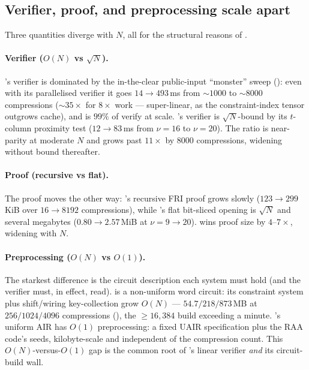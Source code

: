 \subsection{Verifier, proof, and preprocessing scale apart}
\label{sec:res-scaling}

Three quantities diverge with $N$, all for the structural reasons of
.

\paragraph{Verifier ($O(N)$ vs $\sqrt N$).} \binius{}'s verifier is dominated
by the in-the-clear public-input ``monster'' sweep (): even
with its parallelised verifier it goes $14 \to 493$\,ms from $\sim$$1000$ to
$\sim$$8000$ compressions ($\sim$$35\times$ for $8\times$ work --- super-linear,
as the constraint-index tensor outgrows cache), and is $99\%$ of verify at
scale. \zinc{}'s verifier is $\sqrt N$-bound by its $t$-column proximity test
($12 \to 83$\,ms from $\nu{=}16$ to $\nu{=}20$). The ratio is near-parity at
moderate $N$ and grows past $11\times$ by $8000$ compressions, widening
without bound thereafter.

\paragraph{Proof (recursive vs flat).} The proof moves the other way:
\binius{}'s recursive FRI proof grows slowly ($123\!\to\!299$\,KiB over
$16\!\to\!8192$ compressions), while \zinc{}'s flat bit-sliced opening is
$\sqrt N$ and several megabytes ($0.80\!\to\!2.57$\,MiB at $\nu{=}9\!\to\!20$).
\binius{} wins proof size by $4$--$7\times$, widening with $N$.

\paragraph{Preprocessing ($O(N)$ vs $O(1)$).} The starkest difference is the
circuit description each system must hold (and the verifier must, in effect,
read). \binius{} is a non-uniform word circuit: its constraint system plus
shift/wiring key-collection grow $O(N)$ --- $54.7 / 218 / 873$\,MB at
$256 / 1024 / 4096$ compressions (), the
$\ge\!16{,}384$ build exceeding a minute. \zinc{}'s uniform AIR has $O(1)$
preprocessing: a fixed UAIR specification plus the RAA code's seeds,
kilobyte-scale and independent of the compression count. This
$O(N)$-versus-$O(1)$ gap is the common root of \binius{}'s linear verifier
\emph{and} its circuit-build wall.

